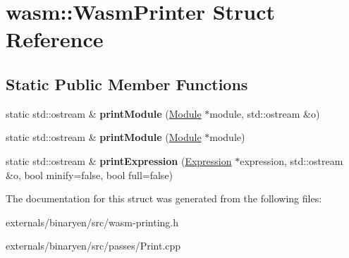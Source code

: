 \hypertarget{structwasm_1_1_wasm_printer}{}\section{wasm\+:\+:Wasm\+Printer Struct Reference}
\label{structwasm_1_1_wasm_printer}
\subsection*{Static Public Member Functions}
\begin{DoxyCompactItemize}
\item 
\mbox{\label{structwasm_1_1_wasm_printer_a7885e2e40a3f0f660826cf1bae789d3a}} 
static std\+::ostream \& {\bfseries print\+Module} (\mbox{\hyperlink{classwasm_1_1_module}{Module}} $\ast$module, std\+::ostream \&o)
\item 
\mbox{\label{structwasm_1_1_wasm_printer_a18f8c526a860a15fdaf7e0e6cd8361cf}} 
static std\+::ostream \& {\bfseries print\+Module} (\mbox{\hyperlink{classwasm_1_1_module}{Module}} $\ast$module)
\item 
\mbox{\label{structwasm_1_1_wasm_printer_a7a9ad8011efe1cb6228bc08ccd620adf}} 
static std\+::ostream \& {\bfseries print\+Expression} (\mbox{\hyperlink{classwasm_1_1_expression}{Expression}} $\ast$expression, std\+::ostream \&o, bool minify=false, bool full=false)
\end{DoxyCompactItemize}


The documentation for this struct was generated from the following files\+:\begin{DoxyCompactItemize}
\item 
externals/binaryen/src/wasm-\/printing.\+h\item 
externals/binaryen/src/passes/Print.\+cpp\end{DoxyCompactItemize}

